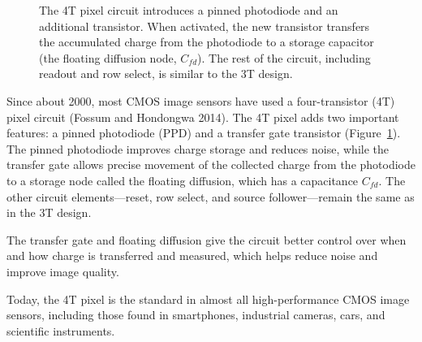 \documentclass[
  letterpaper,
]{book}
\begin{document}
\begin{figure}


\caption{\label{fig-sensor-4T-circuit}The 4T pixel circuit introduces a
pinned photodiode and an additional transistor. When activated, the new
transistor transfers the accumulated charge from the photodiode to a
storage capacitor (the floating diffusion node, \(C_{fd}\)). The rest of
the circuit, including readout and row select, is similar to the 3T
design.}

\end{figure}%

Since about 2000, most CMOS image sensors have used a four-transistor
(4T) pixel circuit (Fossum and Hondongwa 2014). The 4T pixel adds two
important features: a pinned photodiode (PPD) and a transfer gate
transistor (Figure~\ref{fig-sensor-4T-circuit}). The pinned photodiode
improves charge storage and reduces noise, while the transfer gate
allows precise movement of the collected charge from the photodiode to a
storage node called the floating diffusion, which has a capacitance
\(C_{fd}\). The other circuit elements---reset, row select, and source
follower---remain the same as in the 3T design.

The transfer gate and floating diffusion give the circuit better control
over when and how charge is transferred and measured, which helps reduce
noise and improve image quality.

Today, the 4T pixel is the standard in almost all high-performance CMOS
image sensors, including those found in smartphones, industrial cameras,
cars, and scientific instruments.
\end{document}
